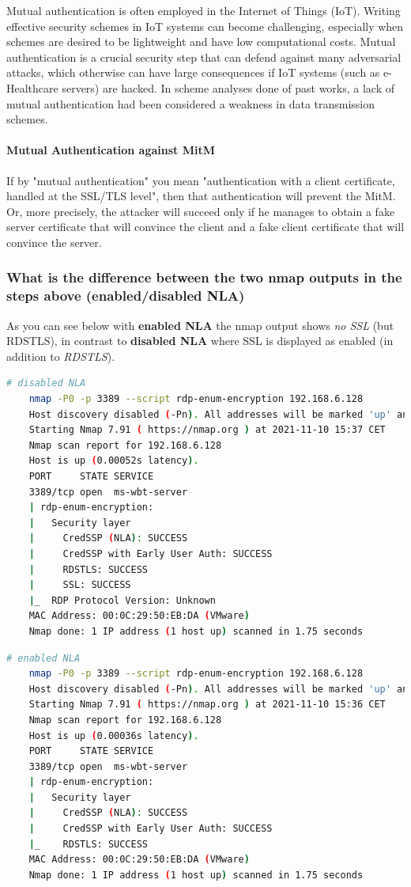 Mutual authentication is often employed in the Internet of Things (IoT). 
Writing effective security schemes in IoT systems can become challenging, especially when schemes are desired to be lightweight and have low computational costs.
 Mutual authentication is a crucial security step that can defend against many adversarial attacks, which otherwise can have large consequences if IoT systems (such as e-Healthcare servers) are hacked.
 In scheme analyses done of past works, a lack of mutual authentication had been considered a weakness in data transmission schemes.

\paragraph{Mutual Authentication against MitM}
If by "mutual authentication" you mean "authentication with a client certificate, handled at the SSL/TLS level", then that authentication will prevent the MitM. Or, more precisely, the attacker will succeed only if he manages to obtain a fake server certificate that will convince the client and a fake client certificate that will convince the server.

\subsubsection{What is the difference between the two nmap outputs in the steps above (enabled/disabled NLA)}
As you can see below with \textbf{enabled NLA} the nmap output shows \textit{no SSL} (but RDSTLS), in contrast to \textbf{disabled NLA} where SSL is displayed as enabled (in addition to \textit{RDSTLS}).
\begin{lstlisting}[language=bash]
    # disabled NLA
    nmap -P0 -p 3389 --script rdp-enum-encryption 192.168.6.128
    Host discovery disabled (-Pn). All addresses will be marked 'up' and scan times will be slower.
    Starting Nmap 7.91 ( https://nmap.org ) at 2021-11-10 15:37 CET
    Nmap scan report for 192.168.6.128
    Host is up (0.00052s latency).
    PORT     STATE SERVICE
    3389/tcp open  ms-wbt-server
    | rdp-enum-encryption:
    |   Security layer
    |     CredSSP (NLA): SUCCESS
    |     CredSSP with Early User Auth: SUCCESS
    |     RDSTLS: SUCCESS
    |     SSL: SUCCESS
    |_  RDP Protocol Version: Unknown
    MAC Address: 00:0C:29:50:EB:DA (VMware)
    Nmap done: 1 IP address (1 host up) scanned in 1.75 seconds
\end{lstlisting}
\begin{lstlisting}[language=bash]
    # enabled NLA
    nmap -P0 -p 3389 --script rdp-enum-encryption 192.168.6.128
    Host discovery disabled (-Pn). All addresses will be marked 'up' and scan times will be slower.
    Starting Nmap 7.91 ( https://nmap.org ) at 2021-11-10 15:36 CET
    Nmap scan report for 192.168.6.128
    Host is up (0.00036s latency).
    PORT     STATE SERVICE
    3389/tcp open  ms-wbt-server
    | rdp-enum-encryption:
    |   Security layer
    |     CredSSP (NLA): SUCCESS
    |     CredSSP with Early User Auth: SUCCESS
    |_    RDSTLS: SUCCESS
    MAC Address: 00:0C:29:50:EB:DA (VMware)
    Nmap done: 1 IP address (1 host up) scanned in 1.75 seconds
\end{lstlisting}
